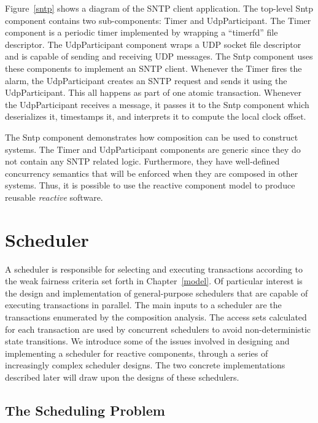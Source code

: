 Figure~\ref{sntp} shows a diagram of the SNTP client application.
The top-level Sntp component contains two sub-components:  Timer and UdpParticipant.
The Timer component is a periodic timer implemented by wrapping a ``timerfd'' file descriptor.
The UdpParticipant component wraps a UDP socket file descriptor and is capable of sending and receiving UDP messages.
The Sntp component uses these components to implement an SNTP client.
Whenever the Timer fires the alarm, the UdpParticipant creates an SNTP request and sends it using the UdpParticipant.
This all happens as part of one atomic transaction.
Whenever the UdpParticipant receives a message, it passes it to the Sntp component which deserializes it, timestamps it, and interprets it to compute the local clock offset.

The Sntp component demonstrates how composition can be used to construct systems.
The Timer and UdpParticipant components are generic since they do not contain any SNTP related logic.
Furthermore, they have well-defined concurrency semantics that will be enforced when they are composed in other systems.
Thus, it is possible to use the reactive component model to produce reusable \emph{reactive} software.

\section{Scheduler}
\label{scheduler}

A scheduler is responsible for selecting and executing transactions according to the weak fairness criteria set forth in Chapter~\ref{model}.
Of particular interest is the design and implementation of general-purpose schedulers that are capable of executing transactions in parallel.
The main inputs to a scheduler are the transactions enumerated by the composition analysis.
The access sets calculated for each transaction are used by concurrent schedulers to avoid non-deterministic state transitions.
We introduce some of the issues involved in designing and implementing a scheduler for reactive components, through a series of increasingly complex scheduler designs.
The two concrete implementations described later will draw upon the designs of these schedulers.

\subsection{The Scheduling Problem}
\label{scheduling_problem}

